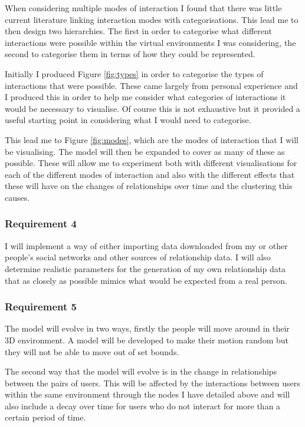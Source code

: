 \documentclass[12pt,a4paper]{article}
\begin{document}
When considering multiple modes of interaction I found that there was little current literature linking interaction modes with categorisations. This lead me to then design two hierarchies. The first in order to categorise what different interactions were possible within the virtual environments I was considering, the second to categorise them in terms of how they could be represented.

Initially I produced Figure \ref{fig:types} in order to categorise the types of interactions that were possible. These came largely from personal experience and I produced this in order to help me consider what categories of interactions it would be necessary to visualise. Of course this is not exhaustive but it provided a useful starting point in considering what I would need to categorise.

This lead me to Figure \ref{fig:modes}, which are the modes of interaction that I will be visualising. The model will then be expanded to cover as many of these as possible. These will allow me to experiment both with different visualisations for each of the different modes of interaction and also with the different effects that these will have on the changes of relationships over time and the clustering this causes.

\subsubsection{Requirement 4}
I will implement a way of either importing data downloaded from my or other people's social networks and other sources of relationship data. I will also determine realistic parameters for the generation of my own relationship data that as closely as possible mimics what would be expected from a real person.

\subsubsection{Requirement 5}
The model will evolve in two ways, firstly the people will move around in their 3D environment. A model will be developed to make their motion random but they will not be able to move out of set bounds.

The second way that the model will evolve is in the change in relationships between the pairs of users. This will be affected by the interactions between users within the same environment through the nodes I have detailed above and will also include a decay over time for users who do not interact for more than a certain period of time.
\end{document}
